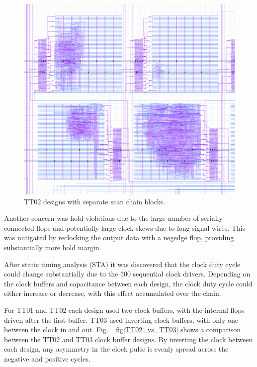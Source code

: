 \begin{figure}[htp]
\centering
\includegraphics[width=\columnwidth]{./Figs/tt02_gds_zoom.png}
\caption{TT02 designs with separate scan chain blocks.}
\label{fig:TT02_separate_scan_blocks}
\end{figure}


Another concern was hold violations due to the large number of serially connected flops and potentially large clock skews due to long signal wires.  This was mitigated by reclocking the output data with a negedge flop, providing substantially more hold margin.

After static timing analysis (STA) it was discovered that the clock duty cycle could change substantially due to the \(500\) sequential clock drivers. Depending on the clock buffers and capacitance between each design, the clock duty cycle could either increase or decrease, with this effect accumulated over the chain.

For TT01 and TT02 each design used two clock buffers, with the internal flops driven after the first buffer.
TT03 used inverting clock buffers, with only one between the clock in and out. Fig. ~\ref{fig:TT02_vs_TT03} shows a comparison between the TT02 and TT03 clock buffer designs.  By inverting the clock between each design, any asymmetry in the clock pulse is evenly spread across the negative and positive cycles.

